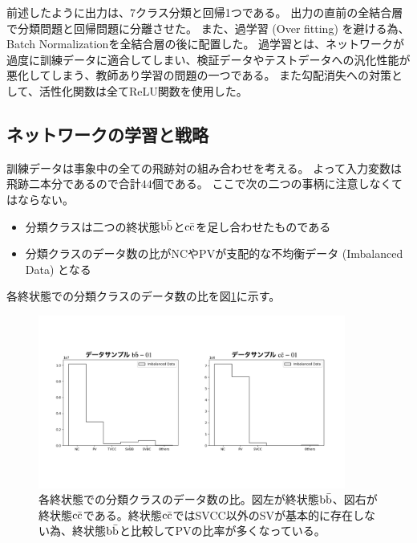 前述したように出力は、7クラス分類と回帰1つである。
出力の直前の全結合層で分類問題と回帰問題に分離させた。
また、過学習 (Over fitting) を避ける為、Batch Normalization\cite{BatchNormalizationpaper}を全結合層の後に配置した。
過学習とは、ネットワークが過度に訓練データに適合してしまい、検証データやテストデータへの汎化性能が悪化してしまう、教師あり学習の問題の一つである。
また勾配消失への対策として、活性化関数は全てReLU関数を使用した。


\subsection{ネットワークの学習と戦略} \label{Net:PM:TrainingandStrategyofPM}

訓練データは事象中の全ての飛跡対の組み合わせを考える。
よって入力変数は飛跡二本分であるので合計$44$個である。
ここで次の二つの事柄に注意しなくてはならない。

\begin{itemize}
 \item 分類クラスは二つの終状態$\rm b\bar{b}$と$\rm c\bar{c}$を足し合わせたものである
 \item 分類クラスのデータ数の比がNCやPVが支配的な不均衡データ (Imbalanced Data) となる
\end{itemize}

各終状態での分類クラスのデータ数の比を図\ref{3-3-2-1ImbalancedData}に示す。

\begin{figure}[htbp]
 \centering
 \includegraphics[trim = 100 200 100 150, width=0.9\textwidth, clip]{Figure/3Networks/3-3-2-1ImbalancedData.png}
 \caption[各終状態での分類クラスのデータ数の比]{各終状態での分類クラスのデータ数の比。図左が終状態$\rm b\bar{b}$、図右が終状態$\rm c\bar{c}$である。終状態$\rm c\bar{c}$ではSVCC以外のSVが基本的に存在しない為、終状態$\rm b\bar{b}$と比較してPVの比率が多くなっている。}
 \label{3-3-2-1ImbalancedData}
\end{figure}

